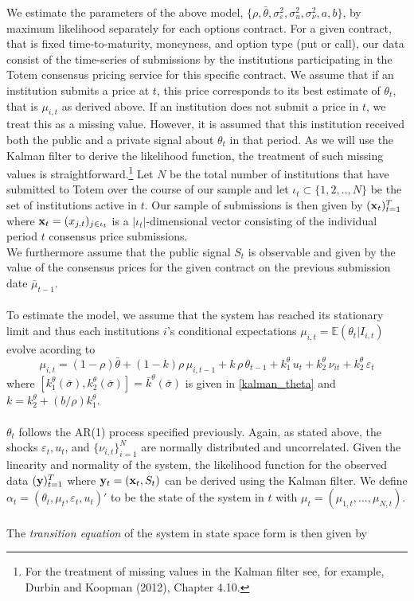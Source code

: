 \documentclass[a4,12pt]{article}
\begin{document}
We estimate the parameters of the above model, $\{\rho, \bar{\theta}, \sigma^2_\varepsilon, \sigma^2_u, \sigma^2_\nu, a, b \}$, by maximum likelihood separately for each options contract. For a given contract, that is fixed time-to-maturity, moneyness, and option type (put or call), our data consist of the time-series of submissions by the institutions participating in the Totem consensus pricing service for this specific contract. We assume that if an institution submits a price at $t$, this price corresponds to its best estimate of $\theta_t$, that is $\mu_{i,t}$ as derived above. If an institution does not submit a price in $t$, we treat this as a missing value. However, it is assumed that this institution received both the public and a private signal about $\theta_t$ in that period. As we will use the Kalman filter to derive the likelihood function, the treatment of such missing values is straightforward.\footnote{For the treatment of missing values in the Kalman filter see, for example, Durbin and Koopman (2012), Chapter 4.10.} Let $N$ be the total number of institutions that have submitted to Totem over the course of our sample and let $\iota_t \subset \{1,2,..,N\}$ be the set of institutions active in $t$. Our sample of submissions is then given by $(\bold{x}_t)_{t=1}^T$ where $\bold{x}_t = (x_{j,t})_{j \in \iota_t}$ is a $|\iota_t|$-dimensional vector consisting of the individual period $t$ consensus price submissions.\\
We furthermore assume that the public signal $S_t$ is observable and given by the value of the consensus prices for the given contract on the previous submission date $\bar{\mu}_{t-1}$.
\\
\\
To estimate the model, we assume that the system has reached its stationary limit and thus each institutions $i$'s conditional expectations $\mu_{i,t} = \mathbb{E}(\theta_t | I_{i,t})$ evolve acording to
\begin{equation}
\mu_{i,t} = (1-\rho) \bar{\theta} + (1-k) \rho \, \mu_{i,t-1} + k \, \rho \, \theta_{t-1} + k_{1}^\theta \, u_t + k_{2}^\theta \, \nu_{it} + k_{2}^\theta \, \varepsilon_t
\end{equation}
where $[k_1^\theta(\bar{\sigma}), k_2^\theta(\bar{\sigma})] = \bar{k}^\theta(\bar{\sigma})$ is given in \eqref{kalman_theta} and $k = k_2^\theta + (b/\rho) k_1^\theta$.\\
\\
$\theta_t$ follows the AR(1) process specified previously. Again, as stated above, the shocks $\varepsilon_t, u_t$, and $\{\nu_{i,t}\}_{i=1}^N$ are normally distributed and uncorrelated. Given the linearity and normality of the system, the likelihood function for the observed data $(\bold{y})_{t=1}^T$ where $\bold{y}_t = (\bold{x}_t,S_t)$ can be derived using the Kalman filter. We define $\alpha_t = (\theta_t, \mu_t, \varepsilon_t, u_t)'$ to be the state of the system in $t$ with $\mu_t = (\mu_{1,t},...,\mu_{N,t})$.\\
\\
The \textit{transition equation} of the system in state space form is then given by
\end{document}

